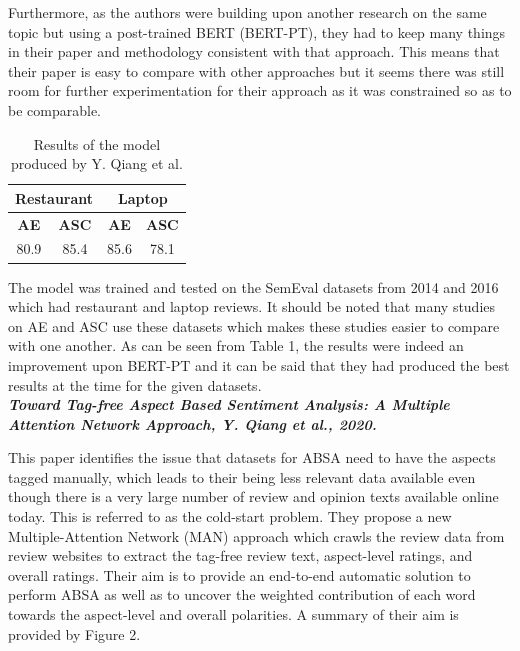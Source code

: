\documentclass[conference]{IEEEtran}
\begin{document}
Furthermore, as the authors were building upon another research on the same topic but using a post-trained BERT (BERT-PT), they had to keep many things in their paper and methodology consistent with that approach. This means that their paper is easy to compare with other approaches but it seems there was still room for further experimentation for their approach as it was constrained so as to be comparable.


\begin{table}[htbp]
\caption{Results of the model produced by Y. Qiang et al.}
\begin{center}
\begin{tabular}{|c|c|c|c|}
\hline
\multicolumn{2}{|c|}{\textbf{Restaurant}} & \multicolumn{2}{|c|}{\textbf{Laptop}} \\
\hline
\textbf{AE} & \textbf{ASC} & \textbf{AE} & \textbf{ASC} \\
\hline
80.9 & 85.4 & 85.6 & 78.1 \\
\hline
\end{tabular}
\end{center}
\end{table}

The model was trained and tested on the SemEval datasets from 2014 and 2016 which had restaurant and laptop reviews. It should be noted that many studies on AE and ASC use these datasets which makes these studies easier to compare with one another. As can be seen from Table 1, the results were indeed an improvement upon BERT-PT and it can be said that they had produced the best results at the time for the given datasets.\\

\textit{\textbf{Toward Tag-free Aspect Based Sentiment Analysis:
A Multiple Attention Network Approach, Y. Qiang et al., 2020.}}

This paper identifies the issue that datasets for ABSA need to have the aspects tagged manually, which leads to their being less relevant data available even though there is a very large number of review and opinion texts available online today. This is referred to as the cold-start problem. They propose a new Multiple-Attention Network (MAN) approach which crawls the review data from review websites to extract the tag-free review text, aspect-level ratings, and overall ratings. Their aim is to provide an end-to-end automatic solution to perform ABSA as well as to uncover the weighted contribution of each word towards the aspect-level and overall polarities. A summary of their aim is provided by Figure 2.
\end{document}
